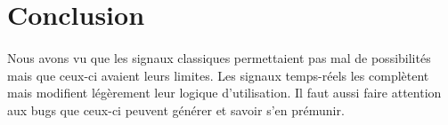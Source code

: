 \documentclass{article}
\begin{document}
\section{Conclusion}

\paragraph{} Nous avons vu que les signaux classiques permettaient pas mal de possibilités mais que ceux-ci avaient leurs limites. Les signaux temps-réels les complètent mais 
modifient légèrement leur logique d'utilisation. Il faut aussi faire attention aux bugs que ceux-ci peuvent générer et savoir s'en prémunir. 
\end{document}
